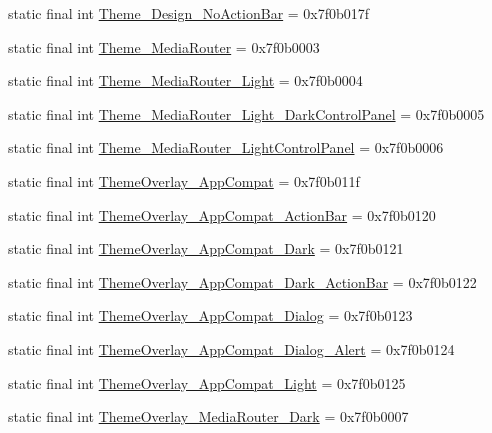 \begin{CompactItemize}
static final int \hyperlink{classandroid_1_1support_1_1mediacompat_1_1_r_1_1style_6147d7101e358d6c60186bc5f44b4635}{Theme\_\-Design\_\-NoActionBar} = 0x7f0b017f
\item 
static final int \hyperlink{classandroid_1_1support_1_1mediacompat_1_1_r_1_1style_bf4b6872e81620c2f140908b056de9f6}{Theme\_\-MediaRouter} = 0x7f0b0003
\item 
static final int \hyperlink{classandroid_1_1support_1_1mediacompat_1_1_r_1_1style_9bb60b54acc5092d76940e1bcae73cf5}{Theme\_\-MediaRouter\_\-Light} = 0x7f0b0004
\item 
static final int \hyperlink{classandroid_1_1support_1_1mediacompat_1_1_r_1_1style_921d3cd40f45f67aa868fed3e180024a}{Theme\_\-MediaRouter\_\-Light\_\-DarkControlPanel} = 0x7f0b0005
\item 
static final int \hyperlink{classandroid_1_1support_1_1mediacompat_1_1_r_1_1style_125556a20957dab36fcaa9910f85dc7f}{Theme\_\-MediaRouter\_\-LightControlPanel} = 0x7f0b0006
\item 
static final int \hyperlink{classandroid_1_1support_1_1mediacompat_1_1_r_1_1style_d2533896a0c8e1112720fa1d93e84fdf}{ThemeOverlay\_\-AppCompat} = 0x7f0b011f
\item 
static final int \hyperlink{classandroid_1_1support_1_1mediacompat_1_1_r_1_1style_a8a78331735ab2f61c0233b5d097b8fa}{ThemeOverlay\_\-AppCompat\_\-ActionBar} = 0x7f0b0120
\item 
static final int \hyperlink{classandroid_1_1support_1_1mediacompat_1_1_r_1_1style_d450974129e844885de5328c42f84675}{ThemeOverlay\_\-AppCompat\_\-Dark} = 0x7f0b0121
\item 
static final int \hyperlink{classandroid_1_1support_1_1mediacompat_1_1_r_1_1style_2eac640ddf0411a40484b2db83d376b7}{ThemeOverlay\_\-AppCompat\_\-Dark\_\-ActionBar} = 0x7f0b0122
\item 
static final int \hyperlink{classandroid_1_1support_1_1mediacompat_1_1_r_1_1style_4b02969e45dd7e22446f86e00bff383f}{ThemeOverlay\_\-AppCompat\_\-Dialog} = 0x7f0b0123
\item 
static final int \hyperlink{classandroid_1_1support_1_1mediacompat_1_1_r_1_1style_03284ec76d40759565f89f1e5fb9168c}{ThemeOverlay\_\-AppCompat\_\-Dialog\_\-Alert} = 0x7f0b0124
\item 
static final int \hyperlink{classandroid_1_1support_1_1mediacompat_1_1_r_1_1style_4b049f158b2c2714a1628256d7c78513}{ThemeOverlay\_\-AppCompat\_\-Light} = 0x7f0b0125
\item 
static final int \hyperlink{classandroid_1_1support_1_1mediacompat_1_1_r_1_1style_78c4ea8c97694c988a01d9c1d042e773}{ThemeOverlay\_\-MediaRouter\_\-Dark} = 0x7f0b0007

\end{CompactItemize}
